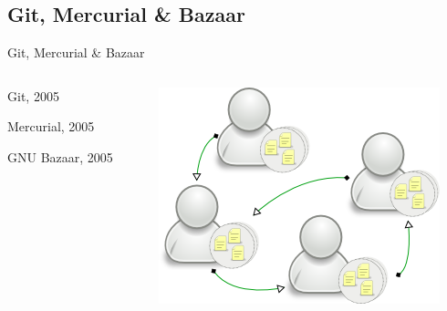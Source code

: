 \subsection{Git, Mercurial \& Bazaar}
\begin{frame}{Git, Mercurial \& Bazaar}
  \begin{columns}[T]

    \begin{column}{.5\textwidth}
      Git, 2005

      Mercurial, 2005

      GNU Bazaar, 2005
    \end{column}

    \begin{column}{.5\textwidth}
      \includegraphics[width=\textwidth]{./hg-model.png}
    \end{column}

  \end{columns}
\end{frame}

